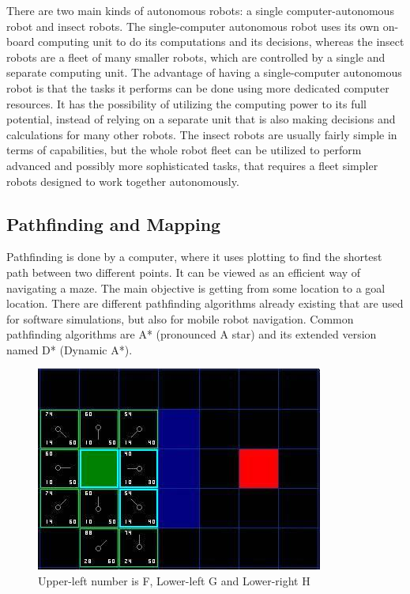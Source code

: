 There are two main kinds of autonomous robots: a single computer-autonomous robot and insect robots. The single-computer autonomous robot uses its own on-board computing unit to do its computations and its decisions, whereas the insect robots are a fleet of many smaller robots, which are controlled by a single and separate computing unit. The advantage of having a single-computer autonomous robot is that the tasks it performs can be done using more dedicated computer resources. It has the possibility of utilizing the computing power to its full potential, instead of relying on a separate unit that is also making decisions and calculations for many other robots. The insect robots are usually fairly simple in terms of capabilities, but the whole robot fleet can be utilized to perform advanced and possibly more sophisticated tasks, that requires a fleet simpler robots designed to work together autonomously\cite{singleandinsect}.

\subsection{Pathfinding and Mapping}

Pathfinding is done by a computer, where it uses plotting to find the shortest path between two different points. It can be viewed as an efficient way of navigating a maze. The main objective is getting from some location to a goal location.
There are different pathfinding algorithms already existing that are used for software simulations, but also for mobile robot navigation. Common pathfinding algorithms are A* (pronounced A star) and its extended version named D* (Dynamic A*).

\begin{figure}[H]
	\centering
	\includegraphics[width=.7\linewidth]{images/aStar2.jpg}
	\caption{Upper-left number is F, Lower-left G and Lower-right H}
	\label{fig:sub2}
\end{figure}

